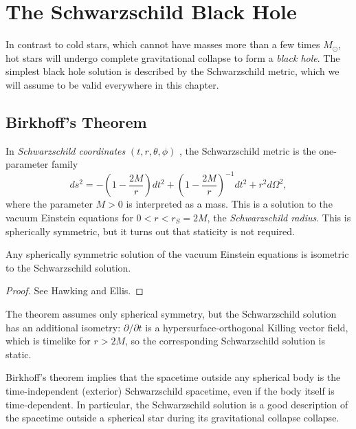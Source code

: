 
\chapter{The Schwarzschild Black Hole}%
\label{cha:the_schwarzschild_black_hole}

In contrast to cold stars, which cannot have masses more than a few times $M_\odot$, hot stars will undergo complete gravitational collapse to form a  \emph{black hole}.
The simplest black hole solution is described by the Schwarzschild metric, which we will assume to be valid everywhere in this chapter.

\section{Birkhoff's Theorem}%
\label{sec:birkhoff_s_theorem}

In \emph{Schwarzschild coordinates} $(t, r, \theta, \phi)$ , the Schwarzschild metric is the one-parameter family
\begin{equation}
  ds^2 = - \left( 1 - \frac{2M}{r} \right) dt^2 + \left( 1- \frac{2M}{r} \right)^{-1} dt^2 + r^2 d\Omega^2,
\end{equation}
where the parameter $M > 0$  is interpreted as a mass.
This is a solution to the vacuum Einstein equations for $0 < r < r_S = 2M$, the  \emph{Schwarzschild radius}.
This is spherically symmetric, but it turns out that staticity is not required.

\begin{theorem}[Birkhoff]
  Any spherically symmetric solution of the vacuum Einstein equations is isometric to the Schwarzschild solution.
\end{theorem}
\begin{proof}
  See Hawking and Ellis.
\end{proof}
The theorem assumes only spherical symmetry, but the Schwarzschild solution has an additional isometry: $\partial / \partial t$ is a hypersurface-orthogonal Killing vector field, which is timelike for $r > 2M$, so the corresponding Schwarzschild solution is static.

Birkhoff's theorem implies that the spacetime outside any spherical body is the time-independent (exterior) Schwarzschild spacetime, even if the body itself is time-dependent.
In particular, the Schwarzschild solution is a good description of the spacetime outside a spherical star during its gravitational collapse collapse.


